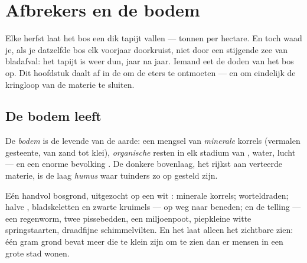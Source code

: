 \chapter{Afbrekers en de bodem}\label{ch:g6:decomposers-and-soil}

Elke herfst laat het bos een dik tapijt  vallen --- tonnen per
hectare. En toch waad je, als je datzelfde bos elk voorjaar doorkruist,
niet door een stijgende zee van bladafval: het tapijt is weer dun, jaar
na jaar. Iemand eet de doden van het bos op. Dit hoofdstuk daalt af in de
 om de eters te ontmoeten --- en om eindelijk de kringloop van de
materie te sluiten.

\section{De bodem leeft}

\begin{definition}[Bodem]\label{def:g6:decomposers-and-soil:soil}
De \emph{bodem} is de levende  van de aarde: een mengsel
van \emph{minerale} korrels (vermalen gesteente, van zand tot klei),
\emph{organische} resten in elk stadium van , water, lucht ---
en een enorme bevolking . De donkere bovenlaag, het rijkst
aan verteerde materie, is de laag \emph{humus} waar tuinders
zo op gesteld zijn.
\end{definition}

\begin{example}\label{ex:g6:decomposers-and-soil:handful}
Eén handvol bosgrond, uitgezocht op een wit : minerale korrels;
worteldraden; halve , bladskeletten en zwarte kruimels ---
 op weg naar beneden; en de telling --- een regenworm,
twee pissebedden, een miljoenpoot, piepkleine witte springstaarten,
draadfijne schimmelvilten. En het  laat alleen het zichtbare zien:
één gram grond bevat meer  die te klein zijn om te zien dan
er mensen in een grote stad wonen.
\end{example}

